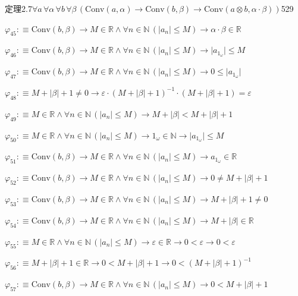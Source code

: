 \begin{fullproof}{定理2.7}{$\forall a\,\forall \alpha\,\forall b\,\forall \beta\,(\mathrm{Conv}(a,\alpha) \to \mathrm{Conv}(b,\beta) \to \mathrm{Conv}(a \otimes b,\alpha \cdot \beta))$}{529}
\begin{abbrevlist}
\item $\varphi_{45} :\equiv \mathrm{Conv}(b,\beta) \to M \in \mathbb{R} \land \forall n \in \mathbb{N}\,(\lvert a_{n} \rvert \leq M) \to \alpha \cdot \beta \in \mathbb{R}$
\item $\varphi_{46} :\equiv \mathrm{Conv}(b,\beta) \to M \in \mathbb{R} \land \forall n \in \mathbb{N}\,(\lvert a_{n} \rvert \leq M) \to \lvert a_{1_{\omega}} \rvert \leq M$
\item $\varphi_{47} :\equiv \mathrm{Conv}(b,\beta) \to M \in \mathbb{R} \land \forall n \in \mathbb{N}\,(\lvert a_{n} \rvert \leq M) \to 0 \leq \lvert a_{1_{\omega}} \rvert$
\item $\varphi_{48} :\equiv M + \lvert \beta \rvert + 1 \neq 0 \to \varepsilon \cdot (M + \lvert \beta \rvert + 1)^{-1} \cdot (M + \lvert \beta \rvert + 1) = \varepsilon$
\item $\varphi_{49} :\equiv M \in \mathbb{R} \land \forall n \in \mathbb{N}\,(\lvert a_{n} \rvert \leq M) \to M + \lvert \beta \rvert < M + \lvert \beta \rvert + 1$
\item $\varphi_{50} :\equiv M \in \mathbb{R} \land \forall n \in \mathbb{N}\,(\lvert a_{n} \rvert \leq M) \to 1_{\omega} \in \mathbb{N} \to \lvert a_{1_{\omega}} \rvert \leq M$
\item $\varphi_{51} :\equiv \mathrm{Conv}(b,\beta) \to M \in \mathbb{R} \land \forall n \in \mathbb{N}\,(\lvert a_{n} \rvert \leq M) \to a_{1_{\omega}} \in \mathbb{R}$
\item $\varphi_{52} :\equiv \mathrm{Conv}(b,\beta) \to M \in \mathbb{R} \land \forall n \in \mathbb{N}\,(\lvert a_{n} \rvert \leq M) \to 0 \neq M + \lvert \beta \rvert + 1$
\item $\varphi_{53} :\equiv \mathrm{Conv}(b,\beta) \to M \in \mathbb{R} \land \forall n \in \mathbb{N}\,(\lvert a_{n} \rvert \leq M) \to M + \lvert \beta \rvert + 1 \neq 0$
\item $\varphi_{54} :\equiv \mathrm{Conv}(b,\beta) \to M \in \mathbb{R} \land \forall n \in \mathbb{N}\,(\lvert a_{n} \rvert \leq M) \to M + \lvert \beta \rvert \in \mathbb{R}$
\item $\varphi_{55} :\equiv M \in \mathbb{R} \land \forall n \in \mathbb{N}\,(\lvert a_{n} \rvert \leq M) \to \varepsilon \in \mathbb{R} \to 0 < \varepsilon \to 0 < \varepsilon$
\item $\varphi_{56} :\equiv M + \lvert \beta \rvert + 1 \in \mathbb{R} \to 0 < M + \lvert \beta \rvert + 1 \to 0 < (M + \lvert \beta \rvert + 1)^{-1}$
\item $\varphi_{57} :\equiv \mathrm{Conv}(b,\beta) \to M \in \mathbb{R} \land \forall n \in \mathbb{N}\,(\lvert a_{n} \rvert \leq M) \to 0 < M + \lvert \beta \rvert + 1$

\end{abbrevlist}
\end{fullproof}
